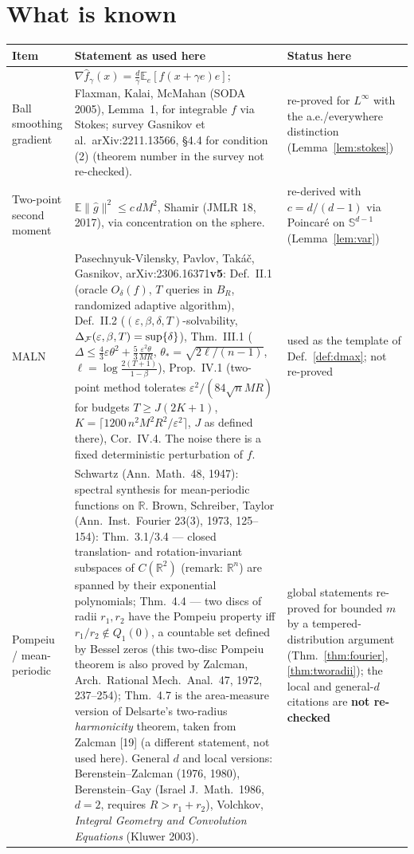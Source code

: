 \documentclass[11pt,a4paper]{article}
\numberwithin{equation}{section}
\theoremstyle{definition}
\theoremstyle{remark}
\newcommand{\E}{\mathbb E}\newcommand{\R}{\mathbb R}\newcommand{\N}{\mathbb N}\newcommand{\Prob}{\mathbb P}
\newcommand{\norm}[1]{\lVert #1\rVert}\newcommand{\abs}[1]{\lvert #1\rvert}\newcommand{\ip}[2]{\langle #1,#2\rangle}
\newcommand{\Sph}{\mathbb S^{d-1}}\newcommand{\Ball}{\mathbb B}
\begin{document}
\section{What is known}\label{sec:known}
\begin{center}\small
\begin{tabularx}{\textwidth}{@{}p{3.3cm}Xp{2.6cm}@{}}
\toprule
\textbf{Item} & \textbf{Statement as used here} & \textbf{Status here}\\\midrule
Ball smoothing gradient & $\nabla\hat f_\gamma(x)=\frac d\gamma\E_e[f(x+\gamma e)e]$; Flaxman, Kalai, McMahan (SODA 2005), Lemma~1, for integrable $f$ via Stokes; survey Gasnikov et al.\ arXiv:2211.13566, \S4.4 for condition (2) (theorem number in the survey not re-checked). & re-proved for $L^\infty$ with the a.e./everywhere distinction (Lemma~\ref{lem:stokes}) \\
Two-point second moment & $\E\norm{\hat g}^2\le c\,dM^2$, Shamir (JMLR 18, 2017), via concentration on the sphere. & re-derived with $c=d/(d-1)$ via Poincaré on $\Sph$ (Lemma~\ref{lem:var}) \\
MALN & Pasechnyuk-Vilensky, Pavlov, Takáč, Gasnikov, arXiv:2306.16371\textbf{v5}: Def.~II.1 (oracle $O_\delta(f)$, $T$ queries in $B_R$, randomized adaptive algorithm), Def.~II.2 ($(\varepsilon,\beta,\delta,T)$-solvability, $\Delta_\mathcal F(\varepsilon,\beta,T)=\sup\{\delta\}$), Thm.~III.1 ($\Delta\le\frac43\varepsilon\theta^2+\frac53\frac{\varepsilon^2\theta}{MR}$, $\theta_*=\sqrt{2\ell/(n-1)}$, $\ell=\log\frac{2(T+1)}{1-\beta}$), Prop.~IV.1 (two-point method tolerates $\varepsilon^2/(84\sqrt nMR)$ for budgets $T\ge J(2K+1)$, $K=\lceil1200\,n^2M^2R^2/\varepsilon^2\rceil$, $J$ as defined there), Cor.~IV.4. The noise there is a fixed deterministic perturbation of $f$. & used as the template of Def.~\ref{def:dmax}; not re-proved \\
Pompeiu / mean-periodic & Schwartz (Ann.\ Math.\ 48, 1947): spectral synthesis for mean-periodic functions on $\R$. Brown, Schreiber, Taylor (Ann.\ Inst.\ Fourier 23(3), 1973, 125--154): Thm.~3.1/3.4 --- closed translation- and rotation-invariant subspaces of $C(\R^2)$ (remark: $\R^n$) are spanned by their exponential polynomials; Thm.~4.4 --- two discs of radii $r_1,r_2$ have the Pompeiu property iff $r_1/r_2\notin Q_1(0)$, a countable set defined by Bessel zeros (this two-disc Pompeiu theorem is also proved by Zalcman, Arch.\ Rational Mech.\ Anal.\ 47, 1972, 237--254); Thm.~4.7 is the area-measure version of Delsarte's two-radius \emph{harmonicity} theorem, taken from Zalcman [19] (a different statement, not used here). General $d$ and local versions: Berenstein--Zalcman (1976, 1980), Berenstein--Gay (Israel J.\ Math.\ 1986, $d=2$, requires $R>r_1+r_2$), Volchkov, \emph{Integral Geometry and Convolution Equations} (Kluwer 2003). & global statements re-proved for bounded $m$ by a tempered-distribution argument (Thm.~\ref{thm:fourier}, \ref{thm:tworadii}); the local and general-$d$ citations are \textbf{not re-checked} \\

\end{tabularx}
\end{center}
\end{document}
